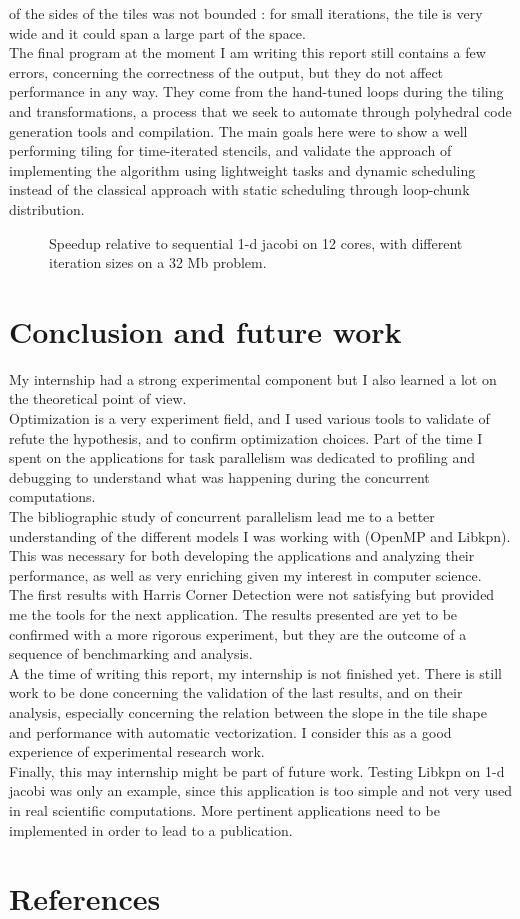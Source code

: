 \documentclass[a4paper,11pt]{article}
\begin{document}
of the sides of the tiles was not bounded : for small iterations, the tile is very wide
and it could span a large part of the space. \\
The final program at the moment I am writing this report still contains a few errors, 
concerning the correctness of the output, but they do not affect performance in any way. 
They come from the hand-tuned loops during the tiling and transformations, a process 
that we seek to automate through polyhedral code generation tools and
compilation. The main goals here were to show a well performing tiling for time-iterated
stencils, and validate the approach of implementing the algorithm using lightweight tasks
and dynamic scheduling instead of the classical approach with static scheduling through
loop-chunk distribution.
\begin{figure}[h]
  \begin{center}
  
  \end{center}
 \caption{Speedup relative to sequential 1-d jacobi on 12 cores, with different iteration 
 sizes on a 32 Mb problem.}
 \label{results_hdiam_var}
\end{figure}

\newpage
\section{Conclusion and future work}
My internship had a strong experimental component but I also learned a lot on the theoretical point
of view. \\
Optimization is a very experiment field, and I used various tools to validate of refute the 
hypothesis, and to confirm optimization choices. Part of the time I spent on the applications for task
parallelism was dedicated to profiling and debugging to understand what was happening during the concurrent
computations.\\
The bibliographic study of concurrent parallelism lead me to a better understanding of the different
models I was working with (OpenMP and Libkpn). This was necessary for both developing the applications
and analyzing their performance, as well as very enriching given my interest in computer science.\\
The first results with Harris Corner Detection were not satisfying but provided me the tools
for the next application. The results presented are yet to be confirmed with a more rigorous 
experiment, but they are the outcome of a sequence of benchmarking and analysis.\\
A the time of writing this report, my internship is not finished yet. There is still work to be done
concerning the validation of the last results, and on their analysis, especially concerning the relation 
between the slope in the tile shape and performance with automatic vectorization. I consider this
as a good experience of experimental research work.\\
Finally, this may internship might be part of future work. Testing Libkpn on 1-d jacobi was only an example,
since this application is too simple and not very used in real scientific computations. More pertinent
applications need to be implemented in order to lead to a publication.


\newpage
\section{References}

\end{document}

